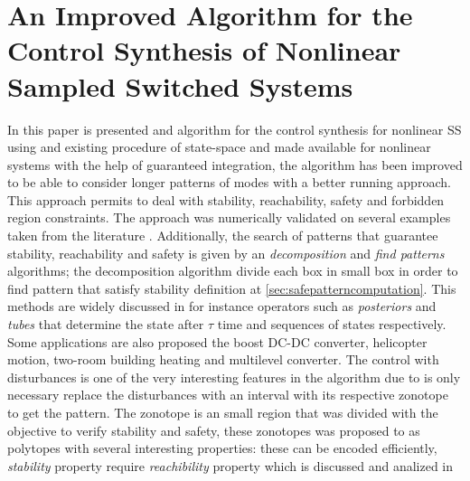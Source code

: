 \section{An Improved Algorithm for the Control Synthesis of Nonlinear Sampled Switched Systems}
    \label{sec:safealgorithm}
    In this paper is presented and algorithm for the control synthesis for
    nonlinear \ac{SS} using and existing procedure of state-space 
    and made available for nonlinear systems with the help of guaranteed 
    integration, the algorithm has been improved to be able to consider longer 
    patterns of modes with a better running approach. This approach permits 
    to deal with stability, reachability, safety and forbidden region 
    constraints. The approach was numerically validated
    on several examples taken from the literature \cite{le2017improved}. Additionally, the search of patterns that guarantee 
    stability, reachability and safety is given by an \emph{decomposition}
    and \emph{find patterns} algorithms; the decomposition algorithm 
    divide each box in small box in order to find pattern that 
    satisfy stability definition at \autoref{sec:safepatterncomputation}. 
    This methods are widely discussed in \citep{fribourg2014finite} for instance 
    operators such as \emph{posteriors} and \emph{tubes} that determine 
    the state after $\tau$ time and sequences of states respectively. 
    Some applications are also proposed the boost DC-DC converter,
    helicopter motion, two-room building heating and multilevel converter.
    The control with disturbances is one of the very interesting features 
    in the algorithm due to is only necessary replace the disturbances with
    an interval with its respective zonotope to get the pattern. The zonotope
    is an small region that was divided with the objective to verify 
    stability and safety, these zonotopes was proposed to as polytopes with
    several interesting properties: these can be encoded efficiently, 
    \emph{stability} property require \emph{reachibility} property which is 
    discussed and analized in \citep*{girard2005reachability}

    

    
    




